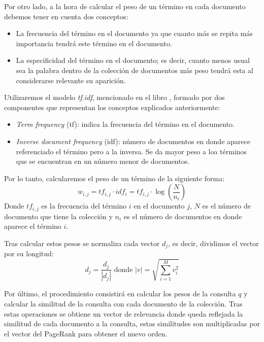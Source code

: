 \documentclass[size=a4, parskip=half, titlepage=false, toc=flat, toc=bib, 12pt, twoside]{scrartcl}
\theoremstyle{theorem-style}
\theoremstyle{definition-style}
\theoremstyle{remark-style}
\theoremstyle{example-style}
\theoremstyle{definition-style}
\theoremstyle{remark-style}
\begin{document}
Por otro lado, a la hora de calcular el peso de un término en cada documento debemos tener en cuenta dos conceptos:
\begin{itemize}
\item La frecuencia del término en el documento ya que cuanto más se repita más importancia tendrá este término en el documento.
\item La especificidad del término en el documento; es decir, cuanto menos usual sea la palabra dentro de la colección de documentos más peso tendrá esta al considerarse relevante su aparición.
\end{itemize}
Utilizaremos el modelo \textit{tf.idf}, mencionado en el libro \cite{ri},  formado por dos componentes que representan los conceptos explicados anteriormente:
\begin{itemize}
\item \textit{Term frequency} (tf): indica la frecuencia del término en el documento.
\item \textit{Inverse document frequency} (idf): número de documentos en donde aparece referenciado el término pero a la inversa. Se da mayor peso a loa términos que se encuentran en un número menor de documentos.
\end{itemize}

Por lo tanto, calcularemos el peso de un término de la siguiente forma:
$$w_{i,j} = tf_{i,j} \cdot idf_i = tf_{i,j} \cdot \log \left(\frac{N}{n_i} \right) $$
Donde $tf_{i,j}$ es la frecuencia del término $i$ en el documento $j$, $N$ es el número de documento que tiene la colección y $n_i$ es el número de documentos en donde aparece el término $i$.

Tras calcular estos pesos se normaliza cada vector $d_j$, es decir, dividimos el vector por su longitud:
$$d_j = \frac{d_j}{|d_j|} \textrm{ donde } |v| = \sqrt{\sum_{i = 1}^M v_i^2} $$

Por último, el procedimiento consistirá en calcular los pesos de la consulta $q$ y calcular la similitud de la consulta con cada documento de la colección. Tras estas operaciones se obtiene un vector de relevancia donde queda reflejada la similitud de cada documento a la consulta, estas similitudes son multiplicadas por el vector del PageRank para obtener el nuevo orden.
\end{document}

